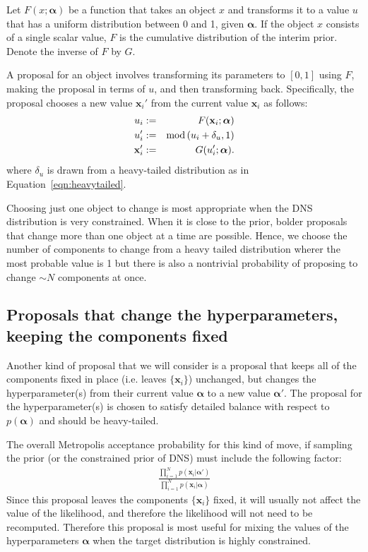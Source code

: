 \documentclass[letterpaper, 11pt]{article}
\newcommand{\hyperparams}{\boldsymbol{\alpha}}
\newcommand{\xx}{\mathbf{x}}
\begin{document}
Let $F(x; \hyperparams)$ be a function that takes an object $x$ and transforms it
to a value $u$ that has a uniform distribution between 0 and 1, given $\hyperparams$.
If the object $x$ consists of a single scalar value, $F$ is the cumulative
distribution of the interim prior. Denote the inverse of $F$ by $G$.

A proposal
for an object involves transforming its parameters to $[0, 1]$ using $F$,
making the proposal in terms of $u$, and then transforming back.
Specifically, the proposal chooses
a new value $\xx_i'$ from the current value $\xx_i$ as follows:
\begin{eqnarray}
u_i &:=& F(\xx_i; \hyperparams)\\
u_i' &:=& \textnormal{mod}\left(u_i + \delta_u, 1\right)\\
\xx_i' &:=& G(u_i'; \hyperparams).
\end{eqnarray}
where $\delta_u$ is drawn from a heavy-tailed distribution as in
Equation~\ref{eqn:heavytailed}.

Choosing just one object to change is most appropriate when the DNS
distribution is very constrained. When it is close to the prior, bolder
proposals that change more than one object at a time are possible. Hence,
we choose the number of components to change from a heavy tailed distribution
wherer the most probable value is 1 but there is also a nontrivial probability
of proposing to change $\sim N$ components at once.

\subsection{Proposals that change the hyperparameters,
keeping the components fixed}\label{sec:proposal3}
Another kind of proposal that we will consider is a proposal that keeps all of
the components fixed in place (i.e. leaves $\{\xx_i\}$) unchanged, but changes
the hyperparameter(s) from their current value $\hyperparams$
to a new value $\hyperparams'$. The proposal for the hyperparameter(s) is chosen
to satisfy detailed balance with respect to $p(\hyperparams)$ and should be
heavy-tailed.

The overall Metropolis acceptance probability
for this kind of move, if sampling the prior (or the constrained prior of DNS)
must include the following factor:
\begin{eqnarray}
\frac{\prod_{i=1}^N p(\xx_i | \hyperparams')}{\prod_{i=1}^N p(\xx_i | \hyperparams)}
\label{eqn:acceptance_prob}
\end{eqnarray}
Since this proposal leaves the components $\{\xx_i\}$ fixed, it will usually not
affect the value of the likelihood, and therefore the likelihood will not need
to be recomputed. Therefore this proposal is most useful for mixing the values
of the hyperparameters $\hyperparams$ when the target distribution is highly
constrained.
\end{document}
